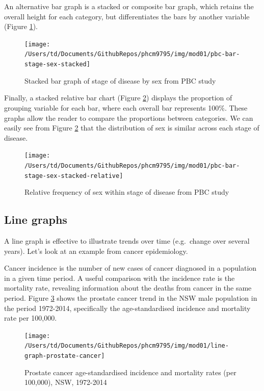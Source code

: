\documentclass[
]{memoir}
\begin{document}
An alternative bar graph is a stacked or composite bar graph, which retains the overall height for each category, but differentiates the bars by another variable (Figure \ref{fig:fig-1-3}).

\begin{figure}[H]
\texttt{[image: /Users/td/Documents/GithubRepos/phcm9795/img/mod01/pbc-bar-stage-sex-stacked]} \caption{Stacked bar graph of stage of disease by sex from PBC study}\label{fig:fig-1-3}
\end{figure}

Finally, a stacked relative bar chart (Figure \ref{fig:fig-1-4}) displays the proportion of grouping variable for each bar, where each overall bar represents 100\%. These graphs allow the reader to compare the proportions between categories. We can easily see from Figure \ref{fig:fig-1-4} that the distribution of sex is similar across each stage of disease.

\begin{figure}[H]
\texttt{[image: /Users/td/Documents/GithubRepos/phcm9795/img/mod01/pbc-bar-stage-sex-stacked-relative]} \caption{Relative frequency of sex within stage of disease from PBC study}\label{fig:fig-1-4}
\end{figure}

\hypertarget{line-graphs}{%
\subsection{Line graphs}\label{line-graphs}}

A line graph is effective to illustrate trends over time (e.g.~change over several years). Let's look at an example from cancer epidemiology.

Cancer incidence is the number of new cases of cancer diagnosed in a population in a given time period. A useful comparison with the incidence rate is the mortality rate, revealing information about the deaths from cancer in the same period. Figure \ref{fig:fig-1-5} shows the prostate cancer trend in the NSW male population in the period 1972-2014, specifically the age-standardised incidence and mortality rate per 100,000.

\begin{figure}[H]
\texttt{[image: /Users/td/Documents/GithubRepos/phcm9795/img/mod01/line-graph-prostate-cancer]} \caption{Prostate cancer age-standardised incidence and mortality rates (per 100,000), NSW, 1972-2014}\label{fig:fig-1-5}
\end{figure}
\end{document}
